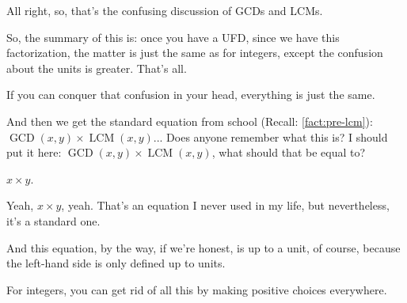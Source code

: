 \begin{speech}[01:27:19 - 01:28:17]
All right, so, that's the confusing discussion of GCDs and LCMs.

So, the summary of this is: once you have a UFD, since we have this factorization, the matter is just the same as for integers, except the confusion about the units is greater. That's all.

If you can conquer that confusion in your head, everything is just the same.

And then we get the standard equation from school (Recall: \cref{fact:pre-lcm}): $\operatorname{GCD}(x, y) \times \operatorname{LCM}(x, y)$... Does anyone remember what this is? I should put it here: $\operatorname{GCD}(x, y) \times \operatorname{LCM}(x, y)$, what should that be equal to?
\end{speech}

\begin{student}
$x \times y$.
\end{student}

\begin{speech}[01:28:18 - 01:28:56]
Yeah, $x \times y$, yeah. That's an equation I never used in my life, but nevertheless, it's a standard one. 

And this equation, by the way, if we're honest, is up to a unit, of course,  because the left-hand side is only defined up to units.

For integers, you can get rid of all this by making positive choices everywhere.
\end{speech}

